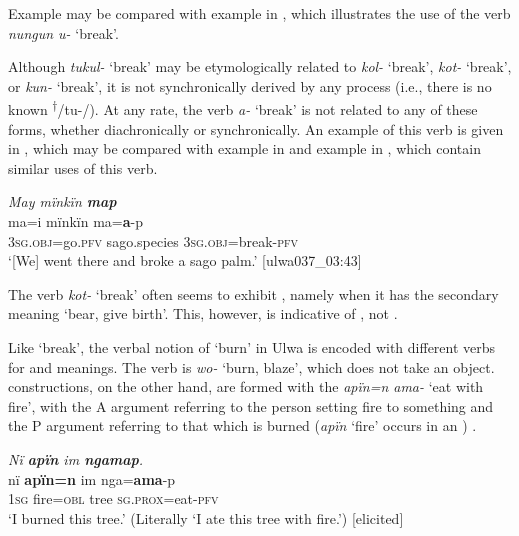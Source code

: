 Example  may be compared with example  in , which illustrates the use of the  verb \textit{nungun u-} ‘break’.

  Although \textit{tukul-} ‘break’ may be etymologically related to \textit{kol-} ‘break’, \textit{kot-} ‘break’, or \textit{kun-} ‘break’, it is not synchronically derived by any process (i.e., there is no known  \textsuperscript{†}/tu-/). At any rate, the  verb \textit{a-} ‘break’ is not related to any of these forms, whether diachronically or synchronically. An example of this  verb is given in , which may be compared with example  in  and example  in , which contain similar uses of this verb.

\ea%
    \label{ex:syntax:297}
          \textit{May mïnkïn \textbf{map}}\\
\gll    ma=i        mïnkïn    ma=\textbf{a}-p\\
    3\textsc{sg.obj}=go.\textsc{pfv}  sago.species  3\textsc{sg.obj}=break-\textsc{pfv}\\
\glt `[We] went there and broke a sago palm.’ [ulwa037\_03:43]
\z

The verb \textit{kot-} ‘break’ often seems to exhibit , namely when it has the secondary meaning ‘bear, give birth’. This, however, is indicative of , not  .

  Like ‘break’, the verbal notion of ‘burn’ in Ulwa is encoded with different verbs for  and  meanings. The  verb is \textit{wo-} ‘burn, blaze’, which does not take an object.  constructions, on the other hand, are formed with the  \textit{apïn=n ama-} ‘eat with fire’, with the A argument referring to the person setting fire to something and the P argument referring to that which is burned (\textit{apïn} ‘fire’ occurs in an  ) .

  \ea%
    \label{ex:syntax:297a}
          \textit{Nï \textbf{apïn} im \textbf{ngamap}.}\\
\gll    nï \textbf{apïn=n} im nga=\textbf{ama}-p\\
    1\textsc{sg} fire=\textsc{obl} tree \textsc{sg.prox}=eat-\textsc{pfv}\\
\glt `I burned this tree.’ (Literally ‘I ate this tree with fire.’) [elicited]
\z

